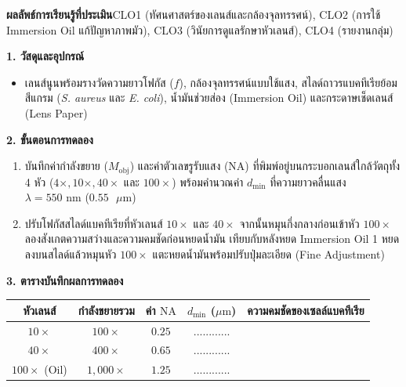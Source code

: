 \begin{labbox}
\noindent\textbf{ผลลัพธ์การเรียนรู้ที่ประเมิน}\quad CLO1 (ทัศนศาสตร์ของเลนส์และกล้องจุลทรรศน์), CLO2 (การใช้ Immersion Oil แก้ปัญหาภาพมัว), CLO3 (วินัยการดูแลรักษาหัวเลนส์), CLO4 (รายงานกลุ่ม)

\vspace{4pt}
\noindent\textbf{1. วัสดุและอุปกรณ์}
\begin{itemize}
    \item เลนส์นูนพร้อมรางวัดความยาวโฟกัส ($f$), กล้องจุลทรรศน์แบบใช้แสง, สไลด์ถาวรแบคทีเรียย้อมสีแกรม (\textit{S. aureus} และ \textit{E. coli}), น้ำมันช่วยส่อง (Immersion Oil) และกระดาษเช็ดเลนส์ (Lens Paper)
\end{itemize}

\noindent\textbf{2. ขั้นตอนการทดลอง}
\begin{enumerate}
    \item บันทึกค่ากำลังขยาย ($M_{\text{obj}}$) และค่าตัวเลขรูรับแสง ($\text{NA}$) ที่พิมพ์อยู่บนกระบอกเลนส์ใกล้วัตถุทั้ง 4 หัว ($4\times, 10\times, 40\times$ และ $100\times$) พร้อมคำนวณค่า $d_{\min}$ ที่ความยาวคลื่นแสง $\lambda = 550\text{ nm}$ ($0.55\text{ }\mu\text{m}$)
    \item ปรับโฟกัสสไลด์แบคทีเรียที่หัวเลนส์ $10\times$ และ $40\times$ จากนั้นหมุนกึ่งกลางก่อนเข้าหัว $100\times$ ลองสังเกตความสว่างและความคมชัดก่อนหยดน้ำมัน เทียบกับหลังหยด Immersion Oil 1 หยดลงบนสไลด์แล้วหมุนหัว $100\times$ แตะหยดน้ำมันพร้อมปรับปุ่มละเอียด (Fine Adjustment)
\end{enumerate}

\noindent\textbf{3. ตารางบันทึกผลการทดลอง}
\begin{center}
\footnotesize\setlength{\tabcolsep}{3.5pt}
\begin{tabularx}{\linewidth}{c c c c >{\raggedright\arraybackslash}X}
\toprule
\textbf{หัวเลนส์} & \textbf{กำลังขยายรวม} & \textbf{ค่า $\text{NA}$} & \textbf{$d_{\min}$ ($\mu\text{m}$)} & \textbf{ความคมชัดของเซลล์แบคทีเรีย} \\
\midrule
$10\times$ & $100\times$ & $0.25$ & ............ & \dotfill \\
$40\times$ & $400\times$ & $0.65$ & ............ & \dotfill \\
$100\times$ (Oil) & $1{,}000\times$ & $1.25$ & ............ & \dotfill \\
\bottomrule
\end{tabularx}
\end{center}
\end{labbox}

